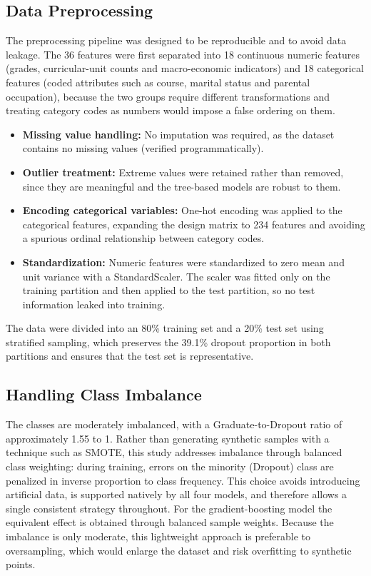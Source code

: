 \documentclass[conference]{IEEEtran}
\begin{document}
	\subsection{Data Preprocessing}
	The preprocessing pipeline was designed to be reproducible and to avoid data leakage. The 36 features were first separated into 18 continuous numeric features (grades, curricular-unit counts and macro-economic indicators) and 18 categorical features (coded attributes such as course, marital status and parental occupation), because the two groups require different transformations and treating category codes as numbers would impose a false ordering on them.
	\begin{itemize}
		\item \textbf{Missing value handling:} No imputation was required, as the dataset contains no missing values (verified programmatically).
		\item \textbf{Outlier treatment:} Extreme values were retained rather than removed, since they are meaningful and the tree-based models are robust to them.
		\item \textbf{Encoding categorical variables:} One-hot encoding was applied to the categorical features, expanding the design matrix to 234 features and avoiding a spurious ordinal relationship between category codes.
		\item \textbf{Standardization:} Numeric features were standardized to zero mean and unit variance with a StandardScaler. The scaler was fitted only on the training partition and then applied to the test partition, so no test information leaked into training.
	\end{itemize}
	The data were divided into an 80\% training set and a 20\% test set using stratified sampling, which preserves the 39.1\% dropout proportion in both partitions and ensures that the test set is representative.
	
	\subsection{Handling Class Imbalance}
	The classes are moderately imbalanced, with a Graduate-to-Dropout ratio of approximately 1.55 to 1. Rather than generating synthetic samples with a technique such as SMOTE, this study addresses imbalance through balanced class weighting: during training, errors on the minority (Dropout) class are penalized in inverse proportion to class frequency. This choice avoids introducing artificial data, is supported natively by all four models, and therefore allows a single consistent strategy throughout. For the gradient-boosting model the equivalent effect is obtained through balanced sample weights. Because the imbalance is only moderate, this lightweight approach is preferable to oversampling, which would enlarge the dataset and risk overfitting to synthetic points.
	
\end{document}
